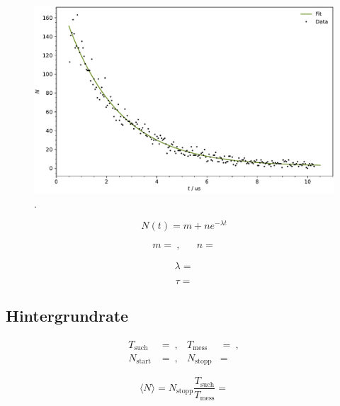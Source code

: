 \begin{figure}[H]
	\centering
	\includegraphics[width=\textwidth]{build/lifetime.pdf}
	\caption{.}
	\label{fig:lifetime}
\end{figure}

\begin{equation*}
	N(t) = m + ne^{-\lambda t}
\end{equation*}

\begin{align*}
	m =  \: , && n = 
\end{align*}

\begin{equation*}
	\lambda = 
\end{equation*}

\begin{equation*}
	\tau = 
\end{equation*}



\subsection{Hintergrundrate}

\begin{align*}
	T_\text{such} &=  \: , & T_\text{mess} &=  \: , \\
	N_\text{start} &=  \: , & N_\text{stopp} &= 
\end{align*}

\begin{equation*}
	\langle N \rangle = N_\text{stopp} \frac{T_\text{such}}{T_\text{mess}} = 
\end{equation*}

